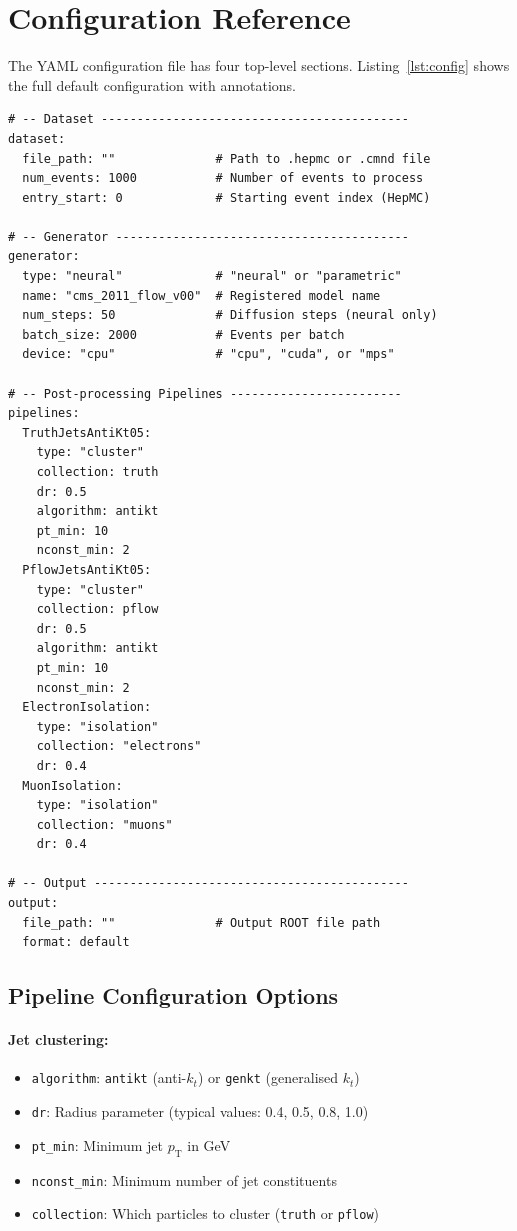 \documentclass[11pt,a4paper]{article}
\begin{document}
\section{Configuration Reference}
\label{sec:config}

The YAML configuration file has four top-level sections. Listing~\ref{lst:config}
shows the full default configuration with annotations.

\begin{lstlisting}[style=yaml,caption={Annotated default configuration.},label=lst:config]
# -- Dataset -------------------------------------------
dataset:
  file_path: ""              # Path to .hepmc or .cmnd file
  num_events: 1000           # Number of events to process
  entry_start: 0             # Starting event index (HepMC)

# -- Generator -----------------------------------------
generator:
  type: "neural"             # "neural" or "parametric"
  name: "cms_2011_flow_v00"  # Registered model name
  num_steps: 50              # Diffusion steps (neural only)
  batch_size: 2000           # Events per batch
  device: "cpu"              # "cpu", "cuda", or "mps"

# -- Post-processing Pipelines ------------------------
pipelines:
  TruthJetsAntiKt05:
    type: "cluster"
    collection: truth
    dr: 0.5
    algorithm: antikt
    pt_min: 10
    nconst_min: 2
  PflowJetsAntiKt05:
    type: "cluster"
    collection: pflow
    dr: 0.5
    algorithm: antikt
    pt_min: 10
    nconst_min: 2
  ElectronIsolation:
    type: "isolation"
    collection: "electrons"
    dr: 0.4
  MuonIsolation:
    type: "isolation"
    collection: "muons"
    dr: 0.4

# -- Output --------------------------------------------
output:
  file_path: ""              # Output ROOT file path
  format: default
\end{lstlisting}

\subsection{Pipeline Configuration Options}

\paragraph{Jet clustering:}
\begin{itemize}
  \item \texttt{algorithm}: \texttt{antikt} (anti-$k_t$) or \texttt{genkt}
    (generalised $k_t$)
  \item \texttt{dr}: Radius parameter (typical values: 0.4, 0.5, 0.8, 1.0)
  \item \texttt{pt\_min}: Minimum jet $p_\mathrm{T}$ in GeV
  \item \texttt{nconst\_min}: Minimum number of jet constituents
  \item \texttt{collection}: Which particles to cluster (\texttt{truth} or \texttt{pflow})
\end{itemize}
\end{document}
